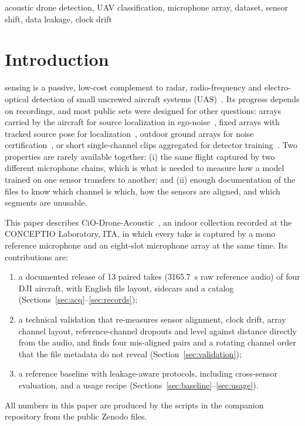 \documentclass[journal]{IEEEtran}
\begin{document}
\begin{IEEEkeywords}
acoustic drone detection, UAV classification, microphone array, dataset, sensor shift, data leakage, clock drift
\end{IEEEkeywords}

\section{Introduction}
 sensing is a passive, low-cost complement to radar, radio-frequency and electro-optical detection of small uncrewed aircraft systems (UAS)~\cite{taha2019review}.
Its progress depends on recordings, and most public sets were designed for other questions: arrays carried by the aircraft for source localization in ego-noise~\cite{strauss2018dregon,gupta2025droneaudioset}, fixed arrays with tracked source pose for localization~\cite{jekaterynczuk2025uavirbase}, outdoor ground arrays for noise certification~\cite{ramosromero2023dronenoise,ramosromero2023ast}, or short single-channel clips aggregated for detector training~\cite{alemadi2019audio,dads,wang2025multiclass}.
Two properties are rarely available together: (i) the same flight captured by two different microphone chains, which is what is needed to measure how a model trained on one sensor transfers to another; and (ii) enough documentation of the files to know which channel is which, how the sensors are aligned, and which segments are unusable.

This paper describes CiO-Drone-Acoustic~\cite{ciodata}, an indoor collection recorded at the CONCEPTIO Laboratory, ITA, in which every take is captured by a mono reference microphone and an eight-slot microphone array at the same time.
Its contributions are:
\begin{enumerate}
\item a documented release of 13 paired takes (\SI{3165.7}{\second} raw reference audio) of four DJI aircraft, with English file layout, sidecars and a catalog (Sections~\ref{sec:acq}--\ref{sec:records});
\item a technical validation that re-measures sensor alignment, clock drift, array channel layout, reference-channel dropouts and level against distance directly from the audio, and finds four mis-aligned pairs and a rotating channel order that the file metadata do not reveal (Section~\ref{sec:validation});
\item a reference baseline with leakage-aware protocols, including cross-sensor evaluation, and a usage recipe (Sections~\ref{sec:baseline}--\ref{sec:usage}).
\end{enumerate}
All numbers in this paper are produced by the scripts in the companion repository from the public Zenodo files.
\end{document}
